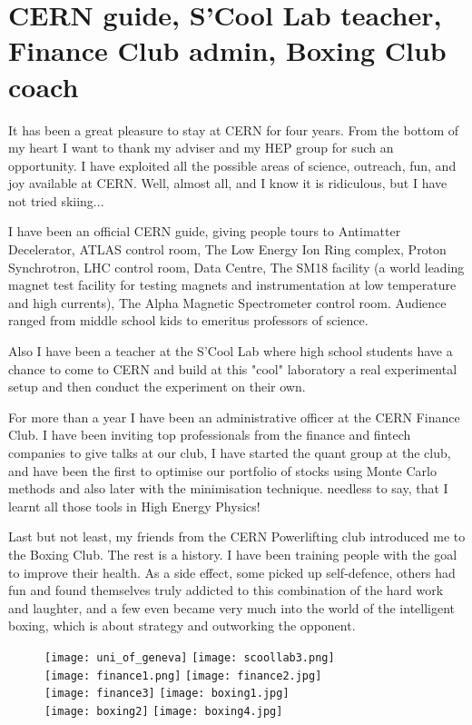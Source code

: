 \clearpage

\section*{CERN guide, S'Cool Lab teacher, Finance Club admin, Boxing Club coach}
\small

It has been a great pleasure to stay at CERN for four years. From the bottom of my heart I want to thank my adviser and my HEP group for such an opportunity. I have exploited all the possible areas of science, outreach, fun, and joy available at CERN. Well, almost all, and I know it is ridiculous, but I have not tried skiing...

I have been an official CERN guide, giving people tours to Antimatter Decelerator, ATLAS control room, The Low Energy Ion Ring complex, Proton Synchrotron, LHC control room, Data Centre, The SM18 facility (a world leading magnet test facility for testing magnets and instrumentation at low temperature and high currents), The Alpha Magnetic Spectrometer control room. Audience ranged from middle school kids to emeritus professors of science. 

Also I have been a teacher at the S'Cool Lab where high school students have a chance to come to CERN and build at this "cool" laboratory a real experimental setup and then conduct the experiment on their own. 

For more than a year I have been an administrative officer at the CERN Finance Club. I have been inviting top professionals from the finance and fintech companies to give talks at our club, I have started the quant group at the club, and have been the first to optimise our portfolio of stocks using Monte Carlo methods and also later with the minimisation technique. needless to say, that I learnt all those tools in High Energy Physics!

Last but not least, my friends from the CERN Powerlifting club introduced me to the Boxing Club. The rest is a history. I have been training people with the goal to improve their health. As a side effect, some picked up self-defence, others had fun and found themselves truly addicted to this combination of the hard work and laughter, and a few even became very much into the world of the intelligent boxing, which is about strategy and outworking the opponent.



\iftrue
\begin{figure}[h]
     \texttt{[image: uni\_of\_geneva]}
     \texttt{[image: scoollab3.png]}\\
     \texttt{[image: finance1.png]}
     \texttt{[image: finance2.jpg]}\\
     \texttt{[image: finance3]}
     \texttt{[image: boxing1.jpg]}\\  
     \texttt{[image: boxing2]}
     \texttt{[image: boxing4.jpg]}\\

   \end{figure}
\fi


